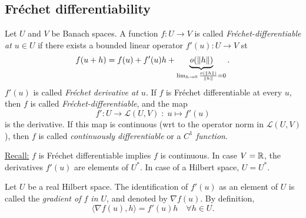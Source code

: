 \documentclass[../skript.tex]{subfiles}
\begin{document}
\subsection{Fréchet differentiability}
\begin{definition} %
\label{def:c1e20}
Let $U$ and $V$ be Banach spaces. A function $f : U \to V$ is called \emph{Fréchet-differentiable at $u\in U$} if there exists a bounded linear operator $f'(u) : U \to V$ \ac{st}
\[
	f(u +h) = f(u) + f'(u) h + \underbrace{ \mathit{o}(\| h \|) }_{\lim_{h \to 0} \frac{o (\| h \|)}{\| h \|} = 0}.
\]
$f'(u)$ is called \emph{Fréchet derivative at $u$}.
If $f$ is Fréchet differentiable at every $u$, then $f$ is called \emph{Fréchet-differentiable}, and the map
\[
	f' : U \to \mathcal{L}(U, V) \; : \; u \mapsto f'(u)
\]
is the derivative.
If this map is continuous (\ac{wrt} to the operator norm in $\mathcal{L}(U, V)$), then $f$ is called \emph{continuously differentiable} or a \emph{$C^1$ function}.
\end{definition}
\underline{Recall:} $f$ is Fréchet differentiable implies $f$ is continuous.
In case $V = \mathbb{R}$, the derivatives $f'(u)$ are elements of $U^*$. In case of a Hilbert space, $U = U^*$.
\begin{definition} %
\label{def:c1e21}
Let $U$ be a real Hilbert space.
The identification of $f'(u)$ as an element of $U$ is called the \emph{gradient of $f$ in $U$}, and denoted by $\nabla f(u)$. By definition,
\[
	\langle \nabla f(u), h \rangle = f'(u)h \quad \forall h \in U.
\]
\end{definition}
\addtocounter{dummythm}{-1} %
\begin{examplenumb} %
\label{ex:c1e21}
\end{examplenumb}
\end{document}
